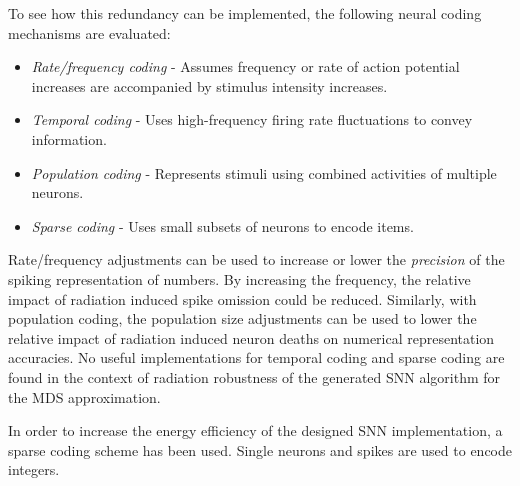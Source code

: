 To see how this redundancy can be implemented, the following neural coding mechanisms are evaluated:
\begin{itemize}
    \item \textit{Rate/frequency coding} - Assumes frequency or rate of action potential increases are accompanied by stimulus intensity increases.
    \item \textit{Temporal coding} - Uses high-frequency firing rate fluctuations to convey information. %
    \item \textit{Population coding} - Represents stimuli using combined activities of multiple neurons.%
    \item \textit{Sparse coding} - Uses small subsets of neurons to encode items. %
\end{itemize}
Rate/frequency adjustments can be used to increase or lower the \textit{precision} %
of the spiking representation of numbers. By increasing the frequency, the relative impact of radiation induced spike omission could be reduced. %
Similarly, with population coding, the population size adjustments can be used to lower the relative impact of radiation induced neuron deaths on numerical representation accuracies. No useful implementations for temporal coding and sparse coding are found in the context of radiation robustness of the generated SNN algorithm for the MDS approximation.

In order to increase the energy efficiency of the designed SNN implementation, a sparse coding scheme has been used. Single neurons and spikes are used to encode integers.